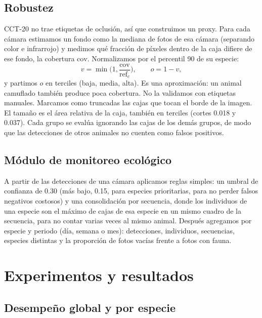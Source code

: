 \documentclass[10pt,letterpaper]{article}
\begin{document}
\subsection{Robustez}
CCT-20 no trae etiquetas de oclusión, así que construimos un proxy. Para cada cámara estimamos un fondo como la mediana de fotos de esa cámara (separando color e infrarrojo) y
medimos qué fracción de píxeles dentro de la caja difiere de ese fondo, la cobertura $\mathrm{cov}$. Normalizamos por el percentil 90 de su especie:
\begin{equation}
v=\min\!\Big(1,\frac{\mathrm{cov}}{\mathrm{ref}_c}\Big),\qquad o=1-v,
\end{equation}
y partimos $o$ en terciles (baja, media, alta). Es una aproximación: un animal camuflado también produce poca cobertura. No la validamos con etiquetas manuales.
Marcamos como truncadas las cajas que tocan el borde de la imagen. El tamaño es el área relativa de la caja, también en terciles (cortes 0.018 y 0.037). Cada grupo se evalúa
ignorando las cajas de los demás grupos, de modo que las detecciones de otros animales no cuenten como falsos positivos.

\subsection{Módulo de monitoreo ecológico}
A partir de las detecciones de una cámara aplicamos reglas simples: un umbral de confianza de 0.30 (más bajo, 0.15, para especies prioritarias, para no perder
falsos negativos costosos) y una consolidación por secuencia, donde los individuos de una especie son el máximo de cajas de esa especie en un mismo cuadro de la secuencia,
para no contar varias veces al mismo animal. Después agregamos por especie y periodo (día, semana o mes): detecciones, individuos, secuencias, especies distintas y la
proporción de fotos vacías frente a fotos con fauna.

\section{Experimentos y resultados}
\subsection{Desempeño global y por especie}
\begin{table}[H]
\centering\small
\caption{Resultados en los conjuntos de prueba. ``Recall'' es a confianza 0.25; ``Vacías con FP'' es la fracción de imágenes vacías con al menos una detección.}\label{tab:resumen}

\end{table}
\end{document}
